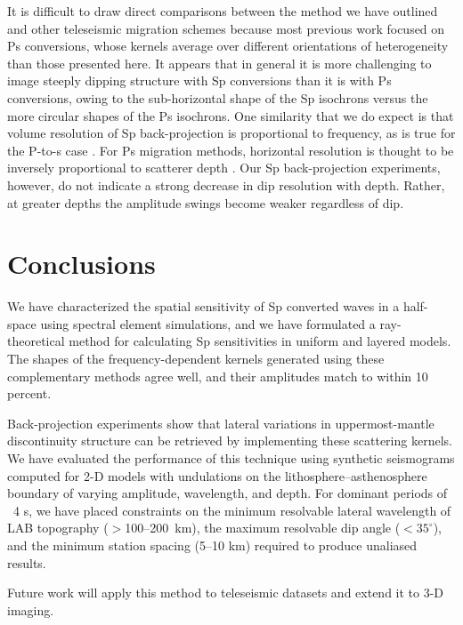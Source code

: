 \documentclass[referee]{gji}
\begin{document}
It is difficult to draw direct comparisons between the method we have outlined and other teleseismic migration schemes \citep[e.g.,][]{Revenaugh1995, Bostock1999, Ryberg2000, Sheehan2000, Poppeliers2003, Frederiksen2004, Cheng2016} because most previous work focused on Ps conversions, whose kernels average over different orientations of heterogeneity than those presented here.  It appears that in general it is more challenging to image steeply dipping structure with Sp conversions than it is with Ps conversions, owing to the sub-horizontal shape of the Sp isochrons versus the more circular shapes of the Ps isochrons.  One similarity that we do expect is that volume resolution of Sp back-projection is proportional to frequency, as is true for the P-to-s case \citep{Rondenay2005}.  For Ps migration methods, horizontal resolution is thought to be inversely proportional to scatterer depth \citep{Poppeliers2003}.  Our Sp back-projection experiments, however, do not indicate a strong decrease in dip resolution with depth. Rather, at greater depths the amplitude swings become weaker regardless of dip.

\section{Conclusions}

We have characterized the spatial sensitivity of Sp converted waves in a half-space using spectral element simulations, and we have formulated a ray-theoretical method for calculating Sp sensitivities in uniform and layered models.  The shapes of the frequency-dependent kernels generated using these complementary methods agree well, and their amplitudes match to within 10 percent.  

Back-projection experiments show that lateral variations in uppermost-mantle discontinuity structure can be retrieved by implementing these scattering kernels.  We have evaluated the performance of this technique using synthetic seismograms computed for 2-D models with undulations on the lithosphere--asthenosphere boundary of varying amplitude, wavelength, and depth. For dominant periods of ~4 s, we have placed constraints on the minimum resolvable lateral wavelength of LAB topography ($>$100--200~km), the maximum resolvable dip angle ($<35^\circ$), and the minimum station spacing (5--10 km) required to produce unaliased results.

Future work will apply this method to teleseismic datasets and extend it to 3-D imaging.
\end{document}
